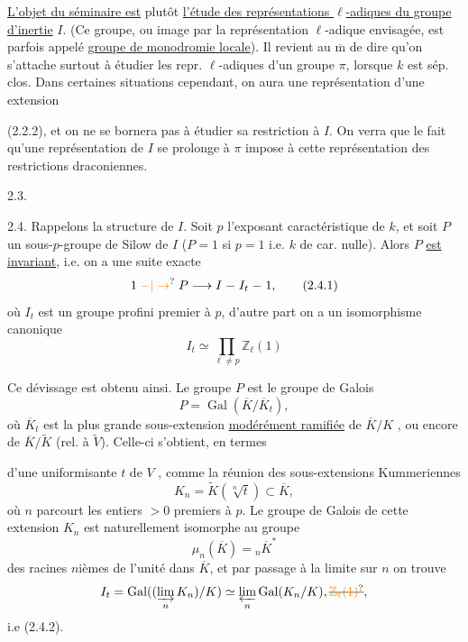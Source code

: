 \uline{L'objet du séminaire est} plutôt \uline{l'étude des représentations \(\ell\)-adiques du groupe d'inertie} \(I\). (Ce groupe, ou  image par la représentation \(\ell\)-adique envisagée,  est parfois appelé \uline{groupe de monodromie locale}). Il revient au \(\overline{\mathrm m}\) de dire qu'on s'attache surtout à étudier les repr. \(\ell\)-adiques d'un groupe \(\pi\), lorsque \(k\) est sép. clos. Dans certaines situations cependant, on aura une représentation d'une extension

(2.2.2), et on ne se bornera pas  à étudier sa restriction à \(I\).  On verra  que  le fait qu'une représentation de \(I\) se prolonge à \(\pi\) impose à cette représentation des restrictions draconiennes.

2.3.

2.4. Rappelons la structure de \(I\). Soit \(p\) l'exposant caractéristique de \(k\),  et soit \(P\)  un  sous-\(p\)-groupe de Silow de \(I\) (\(P=1\) si \(p=1\) i.e. \(k\) de car. nulle). Alors \(P\) \uline{est invariant}, i.e. on a une suite exacte
\[
1\mathrel{\unsure{-|\to}}P\longrightarrow I\mathrel{-} I_t\mathrel{-}1,\tag*{(2.4.1)}
\]
où \(I_t\)  est un groupe profini premier à \(p\), d'autre part on a un isomorphisme canonique
\[
I_t\simeq\prod_{\ell\ne p}\mathbb Z_\ell(1)\tag*{(2.4.2)}
\]

Ce dévissage est obtenu ainsi. Le groupe \(P\) est le groupe de Galois 
\[
P=\operatorname{Gal}(\overline K/\overline K_t),\tag*{(2.4.1)}
\]
où \(\overline K_t\) est la plus  grande sous-extension \uline{modérément ramifiée} de \(\overline K/K\) , ou encore de \(\overline K/\widetilde K\) (rel. à \(\widetilde V\)). Celle-ci s'obtient, en termes

d'une uniformisante   \(t\) de \(V\) , comme la réunion des sous-extensions  Kummeriennes
\[
K_n=\widetilde K(\sqrt[n]{t})\subset\overline K,\tag*{(2.4.4)}
\]
où \(n\) parcourt les entiers \(>0\) premiers à \(p\). Le groupe de Galois de cette extension \(K_n\) est naturellement isomorphe au groupe
\[
\mu_n(\overline K)={}_n\overline K^*
\]
des racines \(n\)ièmes de l'unité dans \(\overline K\), et par passage à la limite sur \(n\) on trouve
\[
I_t=\operatorname{Gal}((\varinjlim_n K_n)/K)\simeq\varprojlim_n\operatorname{Gal}(K_n/K),\deleted{\unsure{\mathbb Z_\ell(1)}},
\]
i.e (2.4.2).

